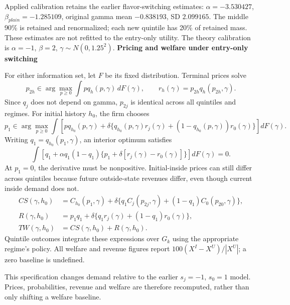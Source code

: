 \documentclass[11pt]{article}
\newcommand{\titleline}[1]{{\Large\bfseries #1}\par\vspace{3pt}}
\begin{document}
Applied calibration retains the earlier flavor-switching estimates:
$\alpha=-3.530427$, $\beta_{plain}=-1.285109$, original gamma mean $-0.838193$,
SD $2.099165$. The middle 90\% is retained and renormalized; each new quintile has
20\% of retained mass. These estimates are not refitted to the entry-only utility.
The theory calibration is $\alpha=-1$, $\beta=2$, $\gamma\sim N(0,1.25^2)$.
\newpage
\titleline{Pricing and welfare under entry-only switching}
For either information set, let $F$ be its fixed distribution. Terminal prices solve
\[
p_{2h}\in\arg\max_{p\geq0}\int p q_h(p,\gamma)\,dF(\gamma),\qquad
r_h(\gamma)=p_{2h}q_h(p_{2h},\gamma).
\]
Since $q_j$ does not depend on gamma, $p_{2j}$ is identical across all quintiles and regimes.
For initial history $h_0$, the firm chooses
\[
p_1\in\arg\max_{p\geq0}\int\left[pq_{h_0}(p,\gamma)
+\delta\{q_{h_0}(p,\gamma)r_j(\gamma)
+(1-q_{h_0}(p,\gamma))r_0(\gamma)\}\right]dF(\gamma).
\]
Writing $q_1=q_{h_0}(p_1,\gamma)$, an interior optimum satisfies
\[
\int\left[q_1+\alpha q_1(1-q_1)
\{p_1+\delta[r_j(\gamma)-r_0(\gamma)]\}\right]dF(\gamma)=0.
\]
At $p_1=0$, the derivative must be nonpositive. Initial-inside prices can still differ
across quintiles because future outside-state revenues differ, even though current inside demand does not.
\begin{align*}
CS(\gamma,h_0)&=C_{h_0}(p_1,\gamma)+\delta\{q_1 C_j(p_{2j},\gamma)+(1-q_1)C_0(p_{20},\gamma)\},\\
R(\gamma,h_0)&=p_1q_1+\delta\{q_1r_j(\gamma)+(1-q_1)r_0(\gamma)\},\\
TW(\gamma,h_0)&=CS(\gamma,h_0)+R(\gamma,h_0).
\end{align*}
Quintile outcomes integrate these expressions over $G_k$ using the appropriate regime's policy.
All welfare and revenue figures report $100(X^{I}-X^{U})/|X^{U}|$; a zero baseline is undefined.

This specification changes demand relative to the earlier $s_j=-1$, $s_0=1$ model.
Prices, probabilities, revenue and welfare are therefore recomputed, rather than only shifting a welfare baseline.
\end{document}

